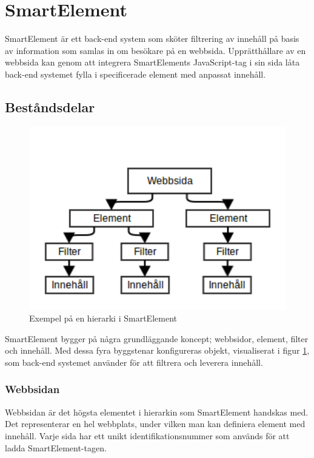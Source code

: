 \section{SmartElement}

SmartElement är ett back-end system som sköter filtrering av innehåll på basis av information som samlas in om besökare på en webbsida. Upprätthållare av en webbsida kan genom att integrera SmartElements JavaScript-tag i sin sida låta back-end systemet fylla i specificerade element med anpassat innehåll.

\subsection{Beståndsdelar}

\begin{figure}[h!]
\centering
\includegraphics[width=120mm]{assets/images/smelementdatamodelabstract.png}
\caption{Exempel på en hierarki i SmartElement}
\label{abstractstructure}
\end{figure}

SmartElement bygger på några grundläggande koncept; webbsidor, element, filter och innehåll. Med dessa fyra byggstenar konfigureras objekt, visualiserat i figur \ref{abstractstructure}, som back-end systemet använder för att filtrera och leverera innehåll.

\subsubsection{Webbsidan}

Webbsidan är det högsta elementet i hierarkin som SmartElement handskas med. Det representerar en hel webbplats, under vilken man kan definiera element med innehåll. Varje sida har ett unikt identifikationsnummer som används för att ladda SmartElement-tagen.

